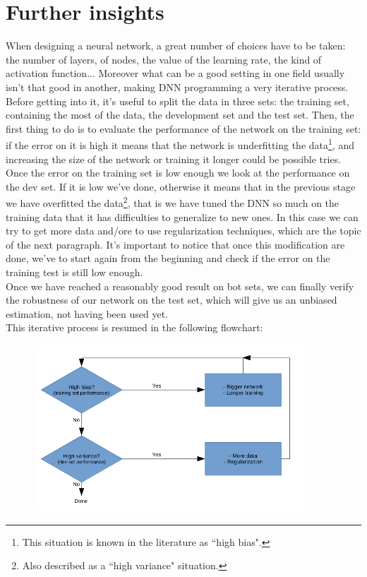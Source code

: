 \documentclass[12pt, a4paper]{report}
\theoremstyle{definition}
\begin{document}
\section{Further insights}\label{section1.2}
When designing a neural network, a great number of choices have to be taken: the number of layers, of nodes, the value of the learning rate, the kind of activation function... Moreover what can be a good setting in one field usually isn't that good in another, making DNN programming a very iterative process. \\
Before getting into it, it's useful to split the data in three sets: the training set, containing the most of the data, the development set and the test set. Then, the first thing to do is to evaluate the performance of the network on the training set: if the error on it is high it means that the network is underfitting the data\footnote{This situation is known in the literature as ``high bias".}, and increasing the size of the network or training it longer could be possible tries. Once the error on the training set is low enough we look at the performance on the dev set. If it is low we've done, otherwise it means that in the previous stage we have overfitted the data\footnote{Also described as a ``high variance" situation.}, that is we have tuned the DNN so much on the training data that it has difficulties to generalize to new ones. In this case we can try to get more data and/ore to use regularization techniques, which are the topic of the next paragraph. It's important to notice that once this modification are done, we've to start again from the beginning and check if the error on the training test is still low enough.\\
Once we have reached a reasonably good result on bot sets, we can finally verify the robustness of our network on the test set, which will give us an unbiased estimation, not having been used yet.\\
This iterative process is resumed in the following flowchart:
\begin{figure}[H]
	\centering
	\includegraphics[width=0.9\textwidth]{img/flowchart}
	\caption{}\label{flowchart}
\end{figure}
\end{document}
